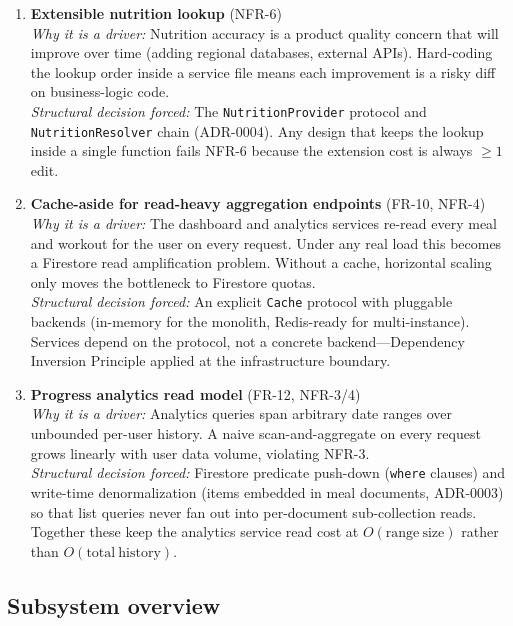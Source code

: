 \documentclass[11pt]{article}
\begin{document}
\begin{enumerate}[leftmargin=1.4em]
  \item \textbf{Extensible nutrition lookup} (NFR-6) \\
  \textit{Why it is a driver:} Nutrition accuracy is a product quality concern that will improve
  over time (adding regional databases, external APIs). Hard-coding the lookup order inside a
  service file means each improvement is a risky diff on business-logic code. \\
  \textit{Structural decision forced:} The \texttt{NutritionProvider} protocol and
  \texttt{NutritionResolver} chain (ADR-0004). Any design that keeps the lookup inside a single
  function fails NFR-6 because the extension cost is always $\geq 1$ edit.

  \item \textbf{Cache-aside for read-heavy aggregation endpoints} (FR-10, NFR-4) \\
  \textit{Why it is a driver:} The dashboard and analytics services re-read every meal and
  workout for the user on every request. Under any real load this becomes a Firestore read
  amplification problem. Without a cache, horizontal scaling only moves the bottleneck to
  Firestore quotas. \\
  \textit{Structural decision forced:} An explicit \texttt{Cache} protocol with pluggable backends
  (in-memory for the monolith, Redis-ready for multi-instance). Services depend on the protocol,
  not a concrete backend---Dependency Inversion Principle applied at the infrastructure boundary.

  \item \textbf{Progress analytics read model} (FR-12, NFR-3/4) \\
  \textit{Why it is a driver:} Analytics queries span arbitrary date ranges over unbounded
  per-user history. A naive scan-and-aggregate on every request grows linearly with user
  data volume, violating NFR-3. \\
  \textit{Structural decision forced:} Firestore predicate push-down (\texttt{where} clauses)
  and write-time denormalization (items embedded in meal documents, ADR-0003) so that list
  queries never fan out into per-document sub-collection reads. Together these keep the
  analytics service read cost at $O(\mathrm{range\ size})$ rather than $O(\mathrm{total\ history})$.

\end{enumerate}

\subsection{Subsystem overview}
\end{document}
